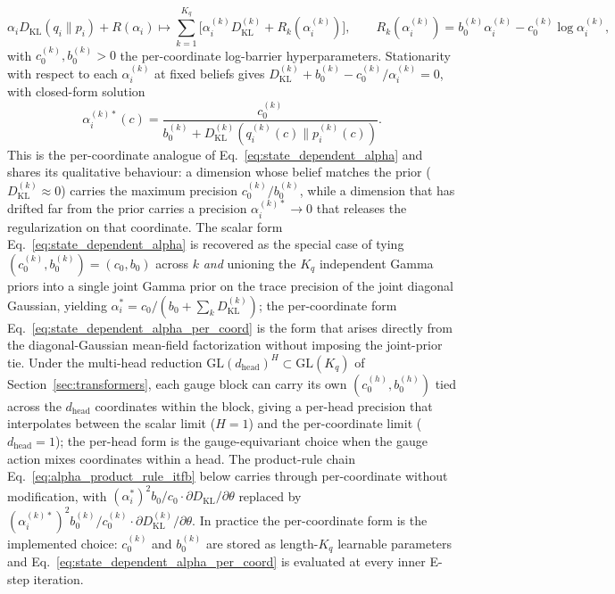 \documentclass[11pt]{article}
\begin{document}
\begin{equation}
\alpha_i  D_{\mathrm{KL}}(q_i \| p_i) + R(\alpha_i)
\longmapsto
\sum_{k=1}^{K_q} \Big[\alpha_i^{(k)} D_{\mathrm{KL}}^{(k)} + R_k(\alpha_i^{(k)})\Big],
\qquad
R_k(\alpha_i^{(k)}) = b_0^{(k)} \alpha_i^{(k)} - c_0^{(k)} \log \alpha_i^{(k)},
\label{eq:adaptive_self_coupling_per_coord}
\end{equation}
with $c_0^{(k)}, b_0^{(k)} > 0$ the per-coordinate log-barrier hyperparameters. Stationarity with respect to each $\alpha_i^{(k)}$ at fixed beliefs gives $D_{\mathrm{KL}}^{(k)} + b_0^{(k)} - c_0^{(k)}/\alpha_i^{(k)} = 0$, with closed-form solution
\begin{equation}
\boxed{
\alpha_i^{(k)*}(c) = \frac{c_0^{(k)}}{b_0^{(k)} + D_{\mathrm{KL}}^{(k)}(q_i^{(k)}(c) \| p_i^{(k)}(c))}.
}
\label{eq:state_dependent_alpha_per_coord}
\end{equation}
This is the per-coordinate analogue of Eq.~\eqref{eq:state_dependent_alpha} and shares its qualitative behaviour: a dimension whose belief matches the prior ($D_{\mathrm{KL}}^{(k)} \approx 0$) carries the maximum precision $c_0^{(k)}/b_0^{(k)}$, while a dimension that has drifted far from the prior carries a precision $\alpha_i^{(k)*} \to 0$ that releases the regularization on that coordinate. The scalar form Eq.~\eqref{eq:state_dependent_alpha} is recovered as the special case of tying $(c_0^{(k)}, b_0^{(k)}) = (c_0, b_0)$ across $k$ \emph{and} unioning the $K_q$ independent Gamma priors into a single joint Gamma prior on the trace precision of the joint diagonal Gaussian, yielding $\alpha_i^* = c_0 / (b_0 + \sum_k D_{\mathrm{KL}}^{(k)})$; the per-coordinate form Eq.~\eqref{eq:state_dependent_alpha_per_coord} is the form that arises directly from the diagonal-Gaussian mean-field factorization without imposing the joint-prior tie. Under the multi-head reduction $\mathrm{GL}(d_{\text{head}})^H \subset \mathrm{GL}(K_q)$ of Section~\ref{sec:transformers}, each gauge block can carry its own $(c_0^{(h)}, b_0^{(h)})$ tied across the $d_{\text{head}}$ coordinates within the block, giving a per-head precision that interpolates between the scalar limit ($H = 1$) and the per-coordinate limit ($d_{\text{head}} = 1$); the per-head form is the gauge-equivariant choice when the gauge action mixes coordinates within a head. The product-rule chain Eq.~\eqref{eq:alpha_product_rule_itfb} below carries through per-coordinate without modification, with $(\alpha_i^*)^2 b_0/c_0 \cdot \partial D_{\mathrm{KL}}/\partial\theta$ replaced by $(\alpha_i^{(k)*})^2 b_0^{(k)}/c_0^{(k)} \cdot \partial D_{\mathrm{KL}}^{(k)}/\partial\theta$. In practice the per-coordinate form is the implemented choice: $c_0^{(k)}$ and $b_0^{(k)}$ are stored as length-$K_q$ learnable parameters and Eq.~\eqref{eq:state_dependent_alpha_per_coord} is evaluated at every inner E-step iteration.
\end{document}
